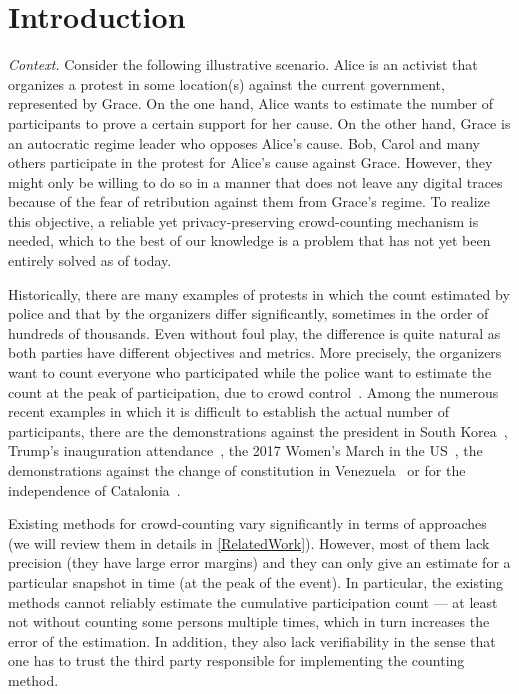 \section{Introduction}%
\label{Introduction}

\emph{Context.} 
Consider the following illustrative scenario.
Alice is an activist that organizes a protest in some location(s) against the current government, represented by Grace.
On the one hand, Alice wants to estimate the number of participants to prove a certain support for her cause.
On the other hand, Grace is an autocratic regime leader who opposes Alice's cause.
Bob, Carol and many others participate in the protest for Alice's cause against Grace.
However, they might only be willing to do so in a manner that does not leave any digital traces because of the fear of retribution against them from Grace's regime. 
To realize this objective, a reliable yet privacy-preserving crowd-counting mechanism is needed, which to the best of our knowledge is a problem that has not yet been entirely solved as of today.

Historically, there are many examples of protests in which the count estimated by police and that by the organizers differ significantly, sometimes in the order of hundreds of thousands.
Even without foul play, the difference is quite natural as both parties have different objectives and metrics.
More precisely, the organizers want to count everyone who participated while the police want to estimate the count at the peak of participation, due to crowd control~\cite{2016DemonstrationsInSeoul}.
Among the numerous recent examples in which it is difficult to establish the actual number of participants, there are the demonstrations against the president in South Korea~\cite{2016DemonstrationsInSeoul}, Trump's inauguration attendance~\cite{HowWillWeKnowTrumpInauguralCrowdSize}, the 2017 Women's March in the US~\cite{2017WomensMarchesInUS}, the demonstrations against the change of constitution in Venezuela~\cite{AlJazeeraOnVenezuela2017} or for the independence of Catalonia~\cite{CataloniaDemonstrations}.

Existing methods for crowd-counting vary significantly in terms of approaches (we will review them in details in \cref{RelatedWork}).
However, most of them lack precision (\ie they have large error margins) and they can only give an estimate for a particular snapshot in time (\eg at the peak of the event). 
In particular, the existing methods cannot reliably estimate the cumulative participation count --- at least not without counting some persons multiple times, which in turn increases the error of the estimation.
In addition, they also lack verifiability in the sense that one has to trust the third party responsible for implementing the counting method. 


